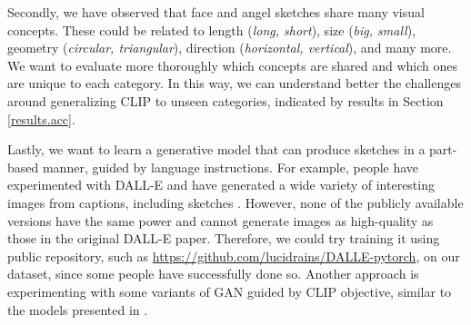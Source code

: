 Secondly, we have observed that face and angel sketches share many visual concepts. These could be related to length (\textit{long, short}), size (\textit{big, small}), geometry (\textit{circular, triangular}), direction (\textit{horizontal, vertical}), and many more. We want to evaluate more thoroughly which concepts are shared and which ones are unique to each category. In this way, we can understand better the challenges around generalizing CLIP to unseen categories, indicated by results in Section \ref{results.acc}.

Lastly, we want to learn a generative model that can produce sketches in a part-based manner, guided by language instructions. For example, people have experimented with DALL-E and have generated a wide variety of interesting images from captions, including sketches \citep{dallePaper,dalle2Paper}. 
However, none of the publicly available versions have the same power and cannot generate images as high-quality as those in the original DALL-E paper. 
Therefore, we could try training it using public repository, such as \url{https://github.com/lucidrains/DALLE-pytorch}, on our dataset, since some people have successfully done so.
Another approach is experimenting with some variants of GAN guided by CLIP objective, similar to the models presented in \cite{sketchbirds,styleganNadaPaper,styleGAN2Paper}.  



